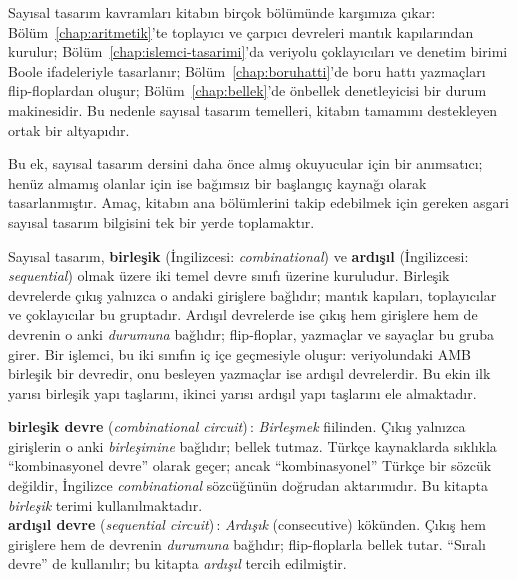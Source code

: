 Sayısal tasarım kavramları kitabın birçok bölümünde karşımıza çıkar: Bölüm~\ref{chap:aritmetik}'te toplayıcı ve çarpıcı devreleri mantık kapılarından kurulur; Bölüm~\ref{chap:islemci-tasarimi}'da veriyolu çoklayıcıları ve denetim birimi Boole ifadeleriyle tasarlanır; Bölüm~\ref{chap:boruhatti}'de boru hattı yazmaçları flip-floplardan oluşur; Bölüm~\ref{chap:bellek}'de önbellek denetleyicisi bir durum makinesidir. Bu nedenle sayısal tasarım temelleri, kitabın tamamını destekleyen ortak bir altyapıdır.

Bu ek, sayısal tasarım dersini daha önce almış okuyucular için bir anımsatıcı; henüz almamış olanlar için ise bağımsız bir başlangıç kaynağı olarak tasarlanmıştır. Amaç, kitabın ana bölümlerini takip edebilmek için gereken asgari sayısal tasarım bilgisini tek bir yerde toplamaktır.

Sayısal tasarım, \textbf{birleşik} (İngilizcesi: \textit{combinational}) ve \textbf{ardışıl} (İngilizcesi: \textit{sequential}) olmak üzere iki temel devre sınıfı üzerine kuruludur. Birleşik devrelerde çıkış yalnızca o andaki girişlere bağlıdır; mantık kapıları, toplayıcılar ve çoklayıcılar bu gruptadır. Ardışıl devrelerde ise çıkış hem girişlere hem de devrenin o anki \emph{durumuna} bağlıdır; flip-floplar, yazmaçlar ve sayaçlar bu gruba girer. Bir işlemci, bu iki sınıfın iç içe geçmesiyle oluşur: veriyolundaki AMB birleşik bir devredir, onu besleyen yazmaçlar ise ardışıl devrelerdir. Bu ekin ilk yarısı birleşik yapı taşlarını, ikinci yarısı ardışıl yapı taşlarını ele almaktadır.

\begin{terimnotu}
\textbf{birleşik devre} (\emph{combinational circuit})\,: \emph{Birleşmek} fiilinden. Çıkış yalnızca girişlerin o anki \emph{birleşimine} bağlıdır; bellek tutmaz. Türkçe kaynaklarda sıklıkla ``kombinasyonel devre'' olarak geçer; ancak ``kombinasyonel'' Türkçe bir sözcük değildir, İngilizce \emph{combinational} sözcüğünün doğrudan aktarımıdır. Bu kitapta \emph{birleşik} terimi kullanılmaktadır.\\[4pt]
\textbf{ardışıl devre} (\emph{sequential circuit})\,: \emph{Ardışık} (consecutive) kökünden. Çıkış hem girişlere hem de devrenin \emph{durumuna} bağlıdır; flip-floplarla bellek tutar. ``Sıralı devre'' de kullanılır; bu kitapta \emph{ardışıl} tercih edilmiştir.
\end{terimnotu}

